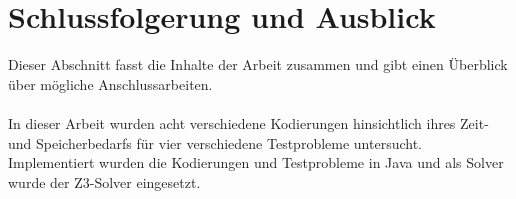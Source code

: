 \documentclass[a4,abstract=on]{scrartcl}
\newcommand*\stdsection{}
\let\stdsection\section
\renewcommand*\section{%
    \clearpage\ifodd\value{page}\else\mbox{}\clearpage\fi
    \stdsection}
\begin{document}
\section{Schlussfolgerung und Ausblick}
Dieser Abschnitt fasst die Inhalte der Arbeit zusammen und gibt einen Überblick über mögliche Anschlussarbeiten.\\
\ \\
In dieser Arbeit wurden acht verschiedene Kodierungen hinsichtlich ihres Zeit- und Speicherbedarfs für vier verschiedene Testprobleme untersucht.\\
Implementiert wurden die Kodierungen und Testprobleme in Java und als Solver wurde der Z$3$-Solver eingesetzt. 




\end{document}
